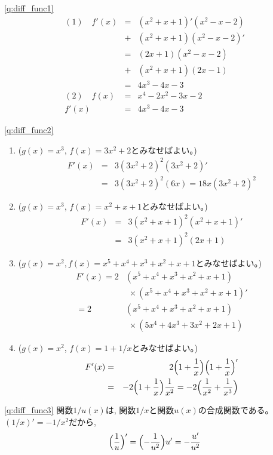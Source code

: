 \ref{q:diff_func1}
\begin{eqnarray*}
(1)\quad f'(x)&=&(x^2+x+1)'(x^2-x-2)\\
     &+&(x^2+x+1)(x^2-x-2)'\\
     &=&(2x+1)(x^2-x-2)\\
     &+&(x^2+x+1)(2x-1)\\
     &=&4x^3-4x-3\\
(2)\quad f(x)&=&x^4-2x^2-3x-2\\
f'(x)&=&4x^3-4x-3
\end{eqnarray*}

\ref{q:diff_func2}
\begin{enumerate}
\item ($g(x)=x^3$, $f(x)=3x^2+2$とみなせばよい。)
\begin{eqnarray*}
F'(x)&=&3(3x^2+2)^2(3x^2+2)'\\
     &=&3(3x^2+2)^2(6x)=18x(3x^2+2)^2\end{eqnarray*}
\item ($g(x)=x^3$, $f(x)=x^2+x+1$とみなせばよい。)
\begin{eqnarray*}
F'(x)&=&3(x^2+x+1)^2(x^2+x+1)'\\
     &=&3(x^2+x+1)^2(2x+1)
\end{eqnarray*}
\item ($g(x)=x^2, f(x)=x^5+x^4+x^3+x^2+x+1$とみなせばよい。)
\begin{eqnarray*}
F'(x)=2&(x^5+x^4+x^3+x^2+x+1)\\
       &\,\,\times(x^5+x^4+x^3+x^2+x+1)'\\
     =2&(x^5+x^4+x^3+x^2+x+1)\\
       &\,\,\times(5x^4+4x^3+3x^2+2x+1)
\end{eqnarray*}
\item ($g(x)=x^2$, $f(x)=1+1/x$とみなせばよい。)
\begin{eqnarray*}
F'(x)&=&2\Bigl(1+\frac{1}{x}\Bigr)\Bigl(1+\frac{1}{x}\Bigr)'\\
     &=&-2\Bigl(1+\frac{1}{x}\Bigr)\frac{1}{x^2}=-2\Bigl(\frac{1}{x^2}+\frac{1}{x^3}\Bigr)
\end{eqnarray*}
\end{enumerate}

\ref{q:diff_func3} 関数$1/u(x)$は, 関数$1/x$と関数$u(x)$の合成関数である。$(1/x)'=-1/x^2$だから, 
\begin{equation*}
\Bigl(\frac{1}{u}\Bigr)'=\Bigl(-\frac{1}{u^2}\Bigr)u'=-\frac{u'}{u^2}
\end{equation*}

